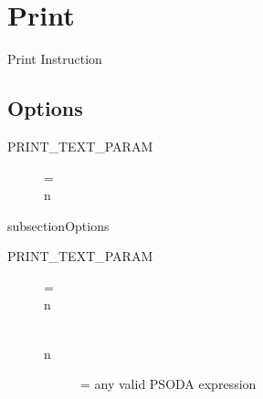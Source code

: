 \section{Print}

Print Instruction

\subsection{Options}
\begin{description}
\item[PRINT\_TEXT\_PARAM] = \\n
\end{description}

subsection{Options}
\begin{description}
\item[PRINT\_TEXT\_PARAM] = \\n
	\begin{description}
	\item[\\n] = any valid PSODA expression
	\end{description}
\end{description}
